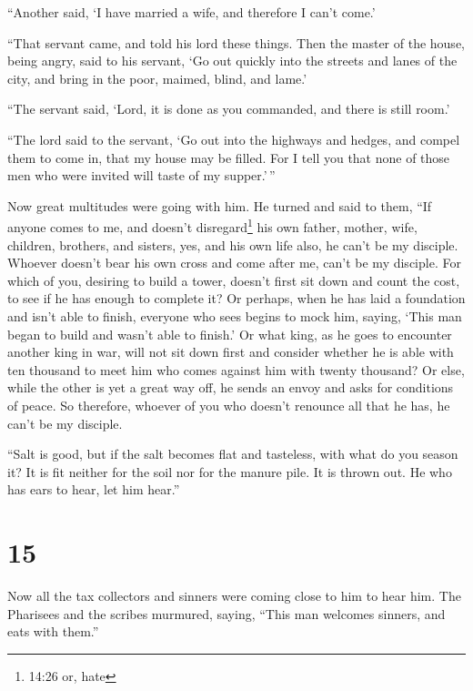  ``Another said, `I have married a wife, and therefore I
can't come.'

 ``That servant came, and told his lord these things. Then
the master of the house, being angry, said to his servant, `Go out
quickly into the streets and lanes of the city, and bring in the poor,
maimed, blind, and lame.'

 ``The servant said, `Lord, it is done as you commanded,
and there is still room.'

 ``The lord said to the servant, `Go out into the highways
and hedges, and compel them to come in, that my house may be filled.
 For I tell you that none of those men who were invited
will taste of my supper.'\,''

 Now great multitudes were going with him. He turned and
said to them,  ``If anyone comes to me, and doesn't
disregard\footnote{14:26 or, hate} his own father, mother, wife,
children, brothers, and sisters, yes, and his own life also, he can't be
my disciple.  Whoever doesn't bear his own cross and come
after me, can't be my disciple.  For which of you, desiring
to build a tower, doesn't first sit down and count the cost, to see if
he has enough to complete it?  Or perhaps, when he has laid
a foundation and isn't able to finish, everyone who sees begins to mock
him,  saying, `This man began to build and wasn't able to
finish.'  Or what king, as he goes to encounter another
king in war, will not sit down first and consider whether he is able
with ten thousand to meet him who comes against him with twenty
thousand?  Or else, while the other is yet a great way off,
he sends an envoy and asks for conditions of peace.  So
therefore, whoever of you who doesn't renounce all that he has, he can't
be my disciple.

 ``Salt is good, but if the salt becomes flat and
tasteless, with what do you season it?  It is fit neither
for the soil nor for the manure pile. It is thrown out. He who has ears
to hear, let him hear.''

\hypertarget{section-14}{%
\section{15}\label{section-14}}

 Now all the tax collectors and sinners were coming close to
him to hear him.  The Pharisees and the scribes murmured,
saying, ``This man welcomes sinners, and eats with them.''

